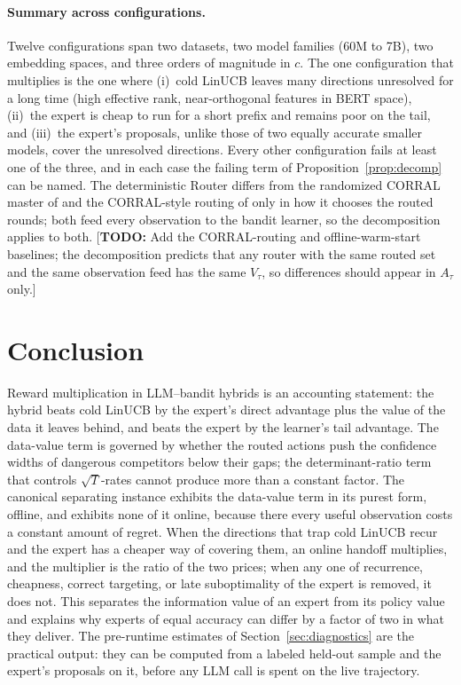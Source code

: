 \documentclass{article}
\theoremstyle{definition}
\theoremstyle{remark}
\theoremstyle{remark}
\newcommand{\todo}[1]{\textcolor{red!70!black}{[\textbf{TODO:} #1]}}
\begin{document}
\paragraph{Summary across configurations.}
Twelve configurations span two datasets, two model families (60M to 7B), two
embedding spaces, and three orders of magnitude in $c$. The one configuration
that multiplies is the one where (i)~cold LinUCB leaves many directions
unresolved for a long time (high effective rank, near-orthogonal features in
BERT space), (ii)~the expert is cheap to run for a short prefix and remains
poor on the tail, and (iii)~the expert's proposals, unlike those of two
equally accurate smaller models, cover the unresolved directions. Every other
configuration fails at least one of the three, and in each case the failing
term of Proposition~\ref{prop:decomp} can be named. The deterministic Router
differs from the randomized CORRAL master of \cite{agarwal2017corralling} and
the CORRAL-style routing of \cite{chen2024llmdecision} only in how it chooses
the routed rounds; both feed every observation to the bandit learner, so the
decomposition applies to both. \todo{Add the CORRAL-routing and
offline-warm-start baselines; the decomposition predicts
that any router with the same routed set and the same observation feed has
the same $V_\tau$, so differences should appear in $A_\tau$ only.}


\section{Conclusion}
\label{sec:conclusion}

Reward multiplication in LLM--bandit hybrids is an accounting statement: the
hybrid beats cold LinUCB by the expert's direct advantage plus the value of the
data it leaves behind, and beats the expert by the learner's tail advantage.
The data-value term is governed by whether the routed actions push the
confidence widths of dangerous competitors below their gaps; the
determinant-ratio term that controls $\sqrt T$-rates cannot produce more than
a constant factor. The canonical separating instance exhibits the data-value
term in its purest form, offline, and exhibits none of it online, because
there every useful observation costs a constant amount of regret. When the
directions that trap cold LinUCB recur and the expert has a cheaper way of
covering them, an online handoff multiplies, and the multiplier is the ratio
of the two prices; when any one of recurrence, cheapness, correct targeting,
or late suboptimality of the expert is removed, it does not. This
separates the information value of an expert from its policy value and
explains why experts of equal accuracy can differ by a factor of two in what
they deliver. The pre-runtime estimates of Section~\ref{sec:diagnostics} are
the practical output: they can be computed from a labeled held-out sample
and the expert's proposals on it, before any LLM call is spent on the live
trajectory.
\end{document}
